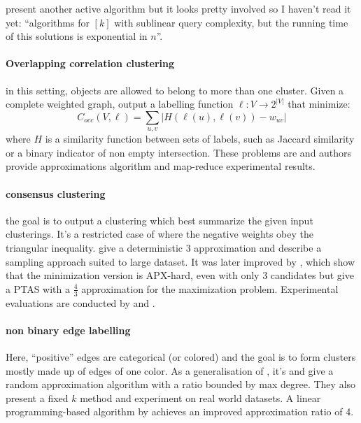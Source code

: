 \autocite[Section 5]{Ailon2014} present another active algorithm but it looks
pretty involved so I haven't read it yet: \enquote{algorithms for \mind$[k]$
with sublinear query complexity, but the running time of this solutions is
exponential in $n$}.

\paragraph{Overlapping correlation clustering \autocite{Bonchi2012}} in this setting,
objects are allowed to belong to more than one cluster. Given a complete
weighted graph, output a labelling function $\ell: V \rightarrow 2^{|V|}$ that
minimize: \[C_{occ}(V, \ell) = \sum_{u,v} \left| H(\ell(u), \ell(v)) -
		w_{uv}\right|\] where $H$ is a similarity function between sets of
labels, such as Jaccard similarity or a binary indicator of non empty
intersection. These problems are \nph{} and authors provide approximations
algorithm and map-reduce experimental results.

\paragraph{consensus clustering} 
the goal is to output a clustering which best summarize the given input
clusterings.  It's a restricted case of \pcc{} where the negative weights obey
the triangular inequality.  \Textcite{Gionis2007} give a deterministic 3
approximation and describe a sampling approach suited to large dataset. It was
later improved by \textcite{Bonizzoni2008}, which show that the minimization
version is APX-hard, even with only 3 candidates but give a PTAS with a
$\frac{4}{3}$ approximation for the maximization problem. Experimental
evaluations are conducted by \textcite{Bertolacci07} and \textcite{Filkov08}.

\paragraph{non binary edge labelling}
Here, \enquote{positive} edges are categorical (or colored) and the goal is to
form clusters mostly made up of edges of one color. As a generalisation of
\pcc{}, it's \nph{} and \textcite{Bonchi2012a} give a random approximation
algorithm with a ratio bounded by max degree. They also present a fixed $k$
method and experiment on real world datasets. A linear programming-based
algorithm by \textcite{Anava2015} achieves an improved approximation ratio of
4.


